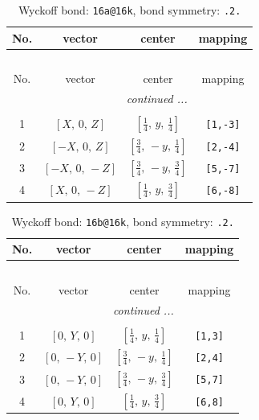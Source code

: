 \documentclass[fleqn,8pt]{jsarticle}
\begin{document}
\begin{longtable}{cccc}
\caption{Wyckoff bond: {\tt 16a@16k}, bond symmetry: {\tt .2.}}
 \\
 \hline \hline
No. & vector & center & mapping \\ \hline \endfirsthead

\multicolumn{3}{l}{\tablename\ \thetable{}} \\
 \hline \hline
No. & vector & center & mapping \\ \hline \endhead

 \hline \hline
\multicolumn{3}{r}{\footnotesize\it continued ...} \\ \endfoot

 \hline \hline
\multicolumn{3}{r}{} \\ \endlastfoot

1 & $\left[ X,\, 0,\, Z \right]$ & $\left[ \frac{1}{4},\, y,\, \frac{1}{4} \right]$ & {\tt [1,-3]} \\ \hline
2 & $\left[ - X,\, 0,\, Z \right]$ & $\left[ \frac{3}{4},\, - y,\, \frac{1}{4} \right]$ & {\tt [2,-4]} \\ \hline
3 & $\left[ - X,\, 0,\, - Z \right]$ & $\left[ \frac{3}{4},\, - y,\, \frac{3}{4} \right]$ & {\tt [5,-7]} \\ \hline
4 & $\left[ X,\, 0,\, - Z \right]$ & $\left[ \frac{1}{4},\, y,\, \frac{3}{4} \right]$ & {\tt [6,-8]} \\
\end{longtable}
\renewcommand{\arraystretch}{1.2}
\begin{longtable}{cccc}
\caption{Wyckoff bond: {\tt 16b@16k}, bond symmetry: {\tt .2.}}
 \\
 \hline \hline
No. & vector & center & mapping \\ \hline \endfirsthead

\multicolumn{3}{l}{\tablename\ \thetable{}} \\
 \hline \hline
No. & vector & center & mapping \\ \hline \endhead

 \hline \hline
\multicolumn{3}{r}{\footnotesize\it continued ...} \\ \endfoot

 \hline \hline
\multicolumn{3}{r}{} \\ \endlastfoot

1 & $\left[ 0,\, Y,\, 0 \right]$ & $\left[ \frac{1}{4},\, y,\, \frac{1}{4} \right]$ & {\tt [1,3]} \\ \hline
2 & $\left[ 0,\, - Y,\, 0 \right]$ & $\left[ \frac{3}{4},\, - y,\, \frac{1}{4} \right]$ & {\tt [2,4]} \\ \hline
3 & $\left[ 0,\, - Y,\, 0 \right]$ & $\left[ \frac{3}{4},\, - y,\, \frac{3}{4} \right]$ & {\tt [5,7]} \\ \hline
4 & $\left[ 0,\, Y,\, 0 \right]$ & $\left[ \frac{1}{4},\, y,\, \frac{3}{4} \right]$ & {\tt [6,8]} \\
\end{longtable}
\end{document}
